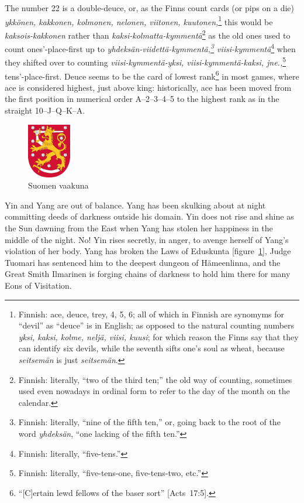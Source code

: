 \documentclass[letterpaper]{article}
\begin{document}
The number 22 is a double-deuce, or, as the Finns count cards (or pips on a die) \foreignlanguage{finnish}{\textit{ykk{\"o}nen, kakkonen, kolmonen, nelonen, viitonen, kuutonen,}}\footnote{Finnish: ace, deuce, trey, 4, 5, 6; all of which in Finnish are synomyms for ``devil'' as ``deuce'' is in English; as opposed to the natural counting numbers \foreignlanguage{finnish}{\textit{yksi, kaksi, kolme, nelj{\"a}, viisi, kuusi};} for which reason the Finns say that they can identify six devils, while the seventh sifts one's soul as wheat, because \foreignlanguage{finnish}{\textit{seitsem{\"a}n}} is just \foreignlanguage{finnish}{\textit{seitsem{\"a}n}}.} this would be \foreignlanguage{finnish}{\textit{kaksois-kakkonen}} rather than \foreignlanguage{finnish}{\textit{kaksi-kolmatta-kymment{\"a}}}\footnote{Finnish: literally, ``two of the third ten;'' the old way of counting, sometimes used even nowadays in ordinal form to refer to the day of the month on the calendar.} as the old ones used to count ones'-place-first up to \foreignlanguage{finnish}{\textit{yhdeks{\"a}n-viidett{\"a}-kymment{\"a},\footnote{Finnish: literally, ``nine of the fifth ten,'' or, going back to the root of the word \foreignlanguage{finnish}{\textit{yhdeks{\"a}n}}, ``one lacking of the fifth ten.''} viisi-kymment{\"a}}}\footnote{Finnish: literally, ``five-tens.''} when they shifted over to counting \foreignlanguage{finnish}{\textit{viisi-kymment{\"a}-yksi, viisi-kymment{\"a}-kaksi, jne.,}}\footnote{Finnish: literally, ``five-tens-one, five-tens-two, etc.''} tens'-place-first.  Deuce seems to be the card of lowest rank\footnote{``[C]ertain lewd fellows of the baser sort'' [Acts~17:5].} in most games, where ace is considered highest, just above king: historically, ace has been moved from the first position in numerical order \mbox{A--2--3--4--5} to the highest rank as in the straight \mbox{10--J--Q--K--A}.

\begin{figure}
	\centering
	\includegraphics[width=0.75in]{Coat_of_arms_of_Finland.png}
	\caption{Suomen vaakuna}
	\label{eduskunta}
\end{figure}
Yin and Yang are out of balance.  Yang has been skulking about at night committing deeds of darkness outside his domain.  Yin does not rise and shine as the Sun dawning from the East when Yang has stolen her happiness in the middle of the night.  No!  Yin rises secretly, in anger, to avenge herself of Yang's violation of her body.  Yang has broken the Laws of \foreignlanguage{finnish}{Eduskunta} [figure~\ref{eduskunta}],
Judge \foreignlanguage{finnish}{Tuomari} has sentenced him to the deepest dungeon of \foreignlanguage{finnish}{H{\"a}meenlinna}, and the Great Smith \foreignlanguage{finnish}{Ilmarinen} \cite{lonnrot1849kalevala,crawford1888kalevala} is forging chains of darkness to hold him there for many Eons of Visitation.
\end{document}
